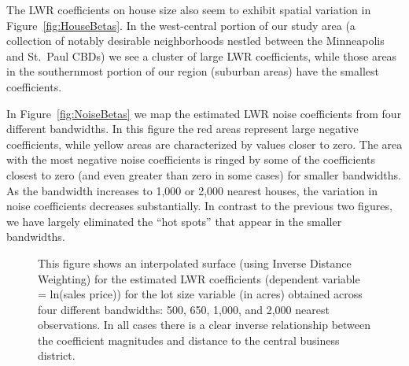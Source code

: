 \documentclass{article}\usepackage[]{graphicx}\usepackage[]{color}
\begin{document}
The LWR coefficients on house size also seem to exhibit spatial variation in Figure~\ref{fig:HouseBetas}. In the west-central portion of our study area (a collection of notably desirable neighborhoods nestled between the Minneapolis and St.\ Paul CBDs) we see a cluster of large LWR coefficients, while those areas in the southernmost portion of our region (suburban areas) have the smallest coefficients. 

In Figure~\ref{fig:NoiseBetas} we map the estimated LWR noise coefficients from four different bandwidths. In this figure the red areas represent large negative coefficients, while yellow areas are characterized by values closer to zero. The area with the most negative noise coefficients is ringed by some of the coefficients closest to zero (and even greater than zero in some cases) for smaller bandwidths. As the bandwidth increases to 1,000 or 2,000 nearest houses, the variation in noise coefficients decreases substantially. In contrast to the previous two figures, we have largely eliminated the ``hot spots'' that appear in the smaller bandwidths. 


\begin{figure}
 \caption{This figure shows an interpolated surface (using Inverse Distance Weighting) for the estimated LWR coefficients (dependent variable = ln(sales price)) for the lot size variable (in acres) obtained across four different bandwidths: 500, 650, 1,000, and 2,000 nearest observations. In all cases there is a clear inverse relationship between the coefficient magnitudes and distance to the central business district.}
 \label{fig:AcreBetas}
\end{figure}
\end{document}

